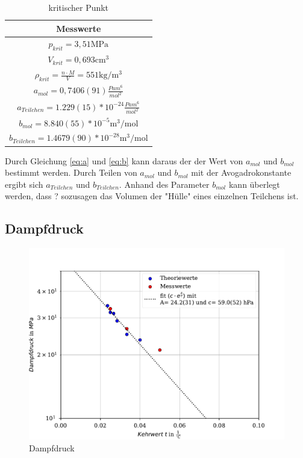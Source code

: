 \documentclass[11pt, a4paper]{article}
\begin{document}
    \begin{table}
        \centering
        \begin{tabular}{c}
            Messwerte \\ \hline
            $p_{krit} = 3,51 \si{\mega\pascal}$ \\
            $V_{krit} = 0,693 \si{\centi\metre\cubed}$ \\
            $\rho_{krit} = \frac{n \cdot M}{V} = 551 \si{\kilogram \per \meter \cubed}$ \\
            $a_{mol} = 0,7406(91) \frac{Pa m^6}{mol^2}$ \\
            $a_{Teilchen} = 1.229(15)*10^{-24} \frac{Pa m^6}{mol^2}$ \\
            $b_{mol} = 8.840(55)*10^{-5}\si{\cubic\metre\per\mol}$\\
            $b_{Teilchen} = 1.4679(90)*10^{-28} \si{\cubic\metre\per\mol}$
        \end{tabular}
        \caption{kritischer Punkt}
        \label{tab:krit}
    \end{table}
    Durch Gleichung \ref{eq:a} und \ref{eq:b} kann daraus der der Wert von $a_{mol}$ und $b_{mol}$ bestimmt werden. Durch Teilen
    von $a_{mol}$ und $b_{mol}$ mit der Avogadrokonstante ergibt sich $a_{Teilchen}$ und $b_{Teilchen}$.
    Anhand des Parameter $b_{mol}$ kann überlegt werden, dass ? sozusagen das Volumen der "Hülle" eines einzelnen Teilchens ist.
    \subsection{Dampfdruck}
    \begin{figure}
        \centering
        \includegraphics[width=\textwidth]{./Plots/dampf.pdf}

        \caption{Dampfdruck}
        \label{fig:dampf}
    \end{figure}
\end{document}
